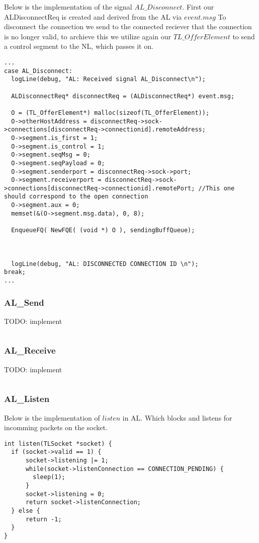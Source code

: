 Below is the implementation of the signal $AL\_Disconnect$.
First our ALDisconnectReq is created and derived from the AL via $event.msg$
To disconnect the connection we send to the connected reciever that the connection is no longer valid, to archieve this
we utilize again our $TL\_OfferElement$ to send a control segment to the NL, which passes it on.
\begin{lstlisting}
...
case AL_Disconnect:
  logLine(debug, "AL: Received signal AL_Disconnect\n");

  ALDisconnectReq* disconnectReq = (ALDisconnectReq*) event.msg;

  O = (TL_OfferElement*) malloc(sizeof(TL_OfferElement));
  O->otherHostAddress = disconnectReq->sock->connections[disconnectReq->connectionid].remoteAddress;
  O->segment.is_first = 1;
  O->segment.is_control = 1;
  O->segment.seqMsg = 0;
  O->segment.seqPayload = 0;
  O->segment.senderport = disconnectReq->sock->port;
  O->segment.receiverport = disconnectReq->sock->connections[disconnectReq->connectionid].remotePort; //This one should correspond to the open connection
  O->segment.aux = 0;
  memset(&(O->segment.msg.data), 0, 8);

  EnqueueFQ( NewFQE( (void *) O ), sendingBuffQueue);



  logLine(debug, "AL: DISCONNECTED CONNECTION ID \n");
break;
...
\end{lstlisting}

\subsubsection{AL\_Send}
TODO: implement
\begin{lstlisting}
\end{lstlisting}

\subsubsection{AL\_Receive}
TODO: implement
\begin{lstlisting}
\end{lstlisting}

\subsubsection{AL\_Listen}
Below is the implementation of $listen$ in AL.
Which blocks and listens for incomming packets on the socket.
\begin{lstlisting}
int listen(TLSocket *socket) {
  if (socket->valid == 1) {
      socket->listening |= 1;
      while(socket->listenConnection == CONNECTION_PENDING) {
        sleep(1);
      }
      socket->listening = 0;
      return socket->listenConnection;
  } else {
      return -1;
  }
}
\end{lstlisting}








\hfill \break
